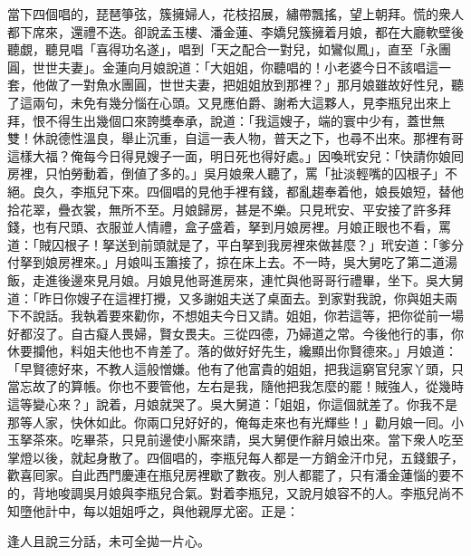 當下四個唱的，琵琶箏弦，簇擁婦人，花枝招展，繡帶飄搖，望上朝拜。慌的衆人都下席來，還禮不迭。卻說孟玉樓、潘金蓮、李嬌兒簇擁着月娘，都在大廳軟壁後聽覷，聽見唱「喜得功名遂」，唱到「天之配合一對兒，如鸞似鳳」，直至「永團圓，世世夫妻」。金蓮向月娘說道：「大姐姐，你聽唱的！小老婆今日不該唱這一套，{}他做了一對魚水團圓，世世夫妻，把姐姐放到那裡？」{}那月娘雖故好性兒，聽了這兩句，未免有幾分惱在心頭。又見應伯爵、謝希大這夥人，見李瓶兒出來上拜，恨不得生出幾個口來誇獎奉承，說道：「我這嫂子，端的寰中少有，蓋世無雙！休說德性溫良，舉止沉重，自這一表人物，普天之下，也尋不出來。那裡有哥這樣大福？俺每今日得見嫂子一面，明日死也得好處。」{}因喚玳安兒：「快請你娘囘房裡，只怕勞動着，倒値了多的。」吳月娘衆人聽了，罵「扯淡輕嘴的囚根子」不絕。良久，李瓶兒下來。四個唱的見他手裡有錢，都亂趨奉着他，娘長娘短，替他拾花翠，疊衣裳，無所不至。月娘歸房，甚是不樂。只見玳安、平安接了許多拜錢，也有尺頭、衣服並人情禮，盒子盛着，拏到月娘房裡。月娘正眼也不看，罵道：「賊囚根子！拏送到前頭就是了，平白拏到我房裡來做甚麼？」玳安道：「爹分付拏到娘房裡來。」{}月娘叫玉簫接了，掠在床上去。不一時，吳大舅吃了第二道湯飯，走進後邊來見月娘。月娘見他哥進房來，連忙與他哥哥行禮畢，坐下。吳大舅道：「昨日你嫂子在這裡打攪，又多謝姐夫送了桌面去。到家對我說，你與姐夫兩下不說話。我執着要來勸你，不想姐夫今日又請。姐姐，你若這等，把你從前一場好都沒了。自古癡人畏婦，賢女畏夫。三從四德，乃婦道之常。今後他行的事，你休要攔他，料姐夫他也不肯差了。落的做好好先生，纔顯出你賢德來。」{}月娘道：「早賢德好來，不教人這般憎嫌。他有了他富貴的姐姐，把我這窮官兒家丫頭，只當忘故了的算帳。你也不要管他，左右是我，隨他把我怎麼的罷！賊強人，從幾時這等變心來？」說着，月娘就哭了。吳大舅道：「姐姐，你這個就差了。你我不是那等人家，快休如此。你兩口兒好好的，俺每走來也有光輝些！」{}勸月娘一囘。小玉拏茶來。吃畢茶，只見前邊使小厮來請，吳大舅便作辭月娘出來。當下衆人吃至掌燈以後，就起身散了。四個唱的，李瓶兒每人都是一方銷金汗巾兒，五錢銀子，歡喜囘家。自此西門慶連在瓶兒房裡歇了數夜。別人都罷了，只有潘金蓮惱的要不的，背地唆調吳月娘與李瓶兒合氣。對着李瓶兒，又說月娘容不的人。李瓶兒尚不知墮他計中，每以姐姐呼之，與他親厚尤密。正是：

\begin{myquote} 
逢人且說三分話，未可全拋一片心。
\end{myquote} 

